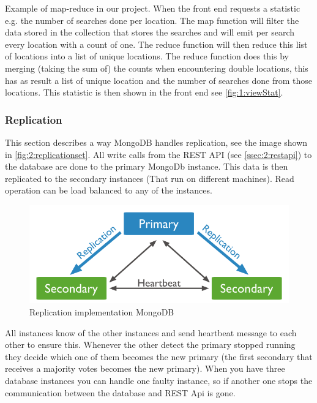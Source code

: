 Example of map-reduce in our project. When the front end requests a statistic e.g. the number of searches done per location. The map function will filter the data stored in the collection that stores the searches and will emit per search every location with a count of one. The reduce function will then reduce this list of locations into a list of unique locations. The reduce function does this by merging (taking the sum of) the counts when encountering double locations, this has as result a list of unique location and the number of searches done from those locations. This statistic is then shown in the front end see \autoref{fig:1:viewStat}.

\subsubsection{Replication}
\label{sssec:2:replication}
This section describes a way MongoDB handles replication, see the image shown in \autoref{fig:2:replicationset}. All write calls from the REST API (see \autoref{ssec:2:restapi}) to the database are done to the primary MongoDb instance. This data is then replicated to the secondary instances (That run on different machines). Read operation can be load balanced to any of the instances. 

\begin{figure}
    \includegraphics[width=\textwidth]{./img/replica_set}   
    \caption{Replication implementation MongoDB}
    \label{fig:2:replicationset}
\end{figure}

All instances know of the other instances and send heartbeat message to each other to ensure this. Whenever the other detect the primary stopped running they decide which one of them becomes the new primary (the first secondary that receives a majority votes becomes the new primary). When you have three database instances you can handle one faulty instance, so if another one stops the communication between the database and REST Api is gone. 

